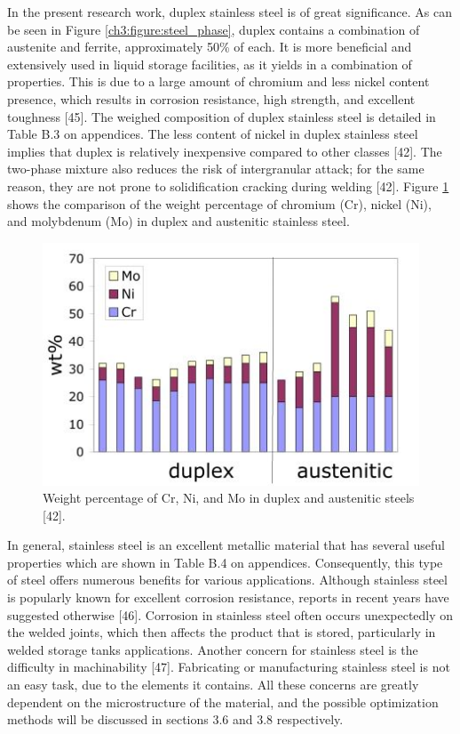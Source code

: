 \documentclass[12pt]{report}
\begin{document}
In the present research work, duplex stainless steel is of great significance. As can be seen in Figure \ref{ch3:figure:steel_phase}, duplex contains a combination of austenite and ferrite, approximately 50\% of each. It is more beneficial and extensively used in liquid storage facilities, as it yields in a combination of properties. This is due to a large amount of chromium and less nickel content presence, which results in corrosion resistance, high strength, and excellent toughness [45]. The weighed composition of duplex stainless steel is detailed in Table B.3 on appendices. The less content of nickel in duplex stainless steel implies that duplex is relatively inexpensive compared to other classes [42]. The two-phase mixture also reduces the risk of intergranular attack; for the same reason, they are not prone to solidification cracking during welding [42]. Figure \ref{ch3:figure:weight} shows the comparison of the weight percentage of chromium (Cr), nickel (Ni), and molybdenum (Mo) in duplex and austenitic stainless steel.
 
\begin{figure}[H]
    \centering
    \includegraphics[width=.65\textwidth]{weight_percentages.jpg}
    \caption{Weight percentage of Cr, Ni, and Mo in duplex and austenitic steels [42].}
    \label{ch3:figure:weight}
\end{figure}

In general, stainless steel is an excellent metallic material that has several useful properties which are shown in Table B.4 on appendices. Consequently, this type of steel offers numerous benefits for various applications. Although stainless steel is popularly known for excellent corrosion resistance, reports in recent years have suggested otherwise [46]. Corrosion in stainless steel often occurs unexpectedly on the welded joints, which then affects the product that is stored, particularly in welded storage tanks applications. Another concern for stainless steel is the difficulty in machinability [47]. Fabricating or manufacturing stainless steel is not an easy task, due to the elements it contains. All these concerns are greatly dependent on the microstructure of the material, and the possible optimization methods will be discussed in sections 3.6 and 3.8 respectively.
\end{document}
